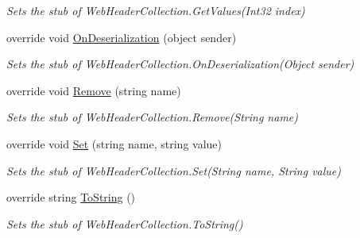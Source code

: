 \begin{DoxyCompactItemize}
\begin{DoxyCompactList}\small\item\em Sets the stub of Web\-Header\-Collection.\-Get\-Values(\-Int32 index)\end{DoxyCompactList}\item 
override void \hyperlink{class_system_1_1_net_1_1_fakes_1_1_stub_web_header_collection_a549b42e7c04b7b3e529bf4c9820698c7}{On\-Deserialization} (object sender)
\begin{DoxyCompactList}\small\item\em Sets the stub of Web\-Header\-Collection.\-On\-Deserialization(\-Object sender)\end{DoxyCompactList}\item 
override void \hyperlink{class_system_1_1_net_1_1_fakes_1_1_stub_web_header_collection_a8677c4d1e622c5514542ee5d33e7bdee}{Remove} (string name)
\begin{DoxyCompactList}\small\item\em Sets the stub of Web\-Header\-Collection.\-Remove(\-String name)\end{DoxyCompactList}\item 
override void \hyperlink{class_system_1_1_net_1_1_fakes_1_1_stub_web_header_collection_a63526de1171d49c66b143938b2007712}{Set} (string name, string value)
\begin{DoxyCompactList}\small\item\em Sets the stub of Web\-Header\-Collection.\-Set(\-String name, String value)\end{DoxyCompactList}\item 
override string \hyperlink{class_system_1_1_net_1_1_fakes_1_1_stub_web_header_collection_a6d6a13b31798a2a367e1766f2a52d0f1}{To\-String} ()
\begin{DoxyCompactList}\small\item\em Sets the stub of Web\-Header\-Collection.\-To\-String()\end{DoxyCompactList}\end{DoxyCompactItemize}
